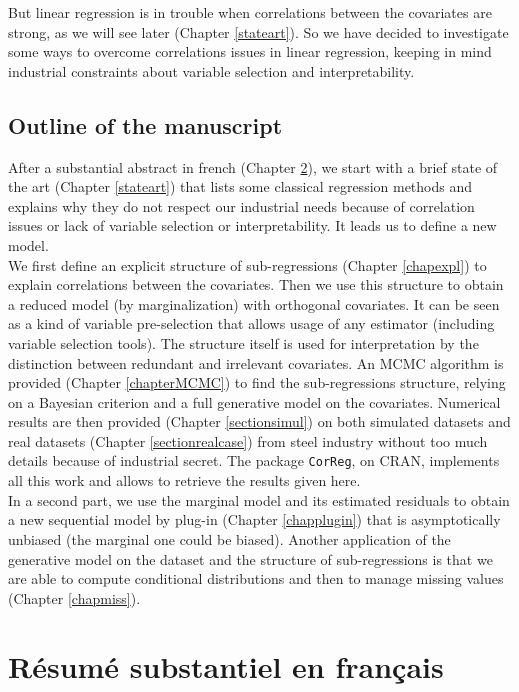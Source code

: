 \documentclass[12pt,a4paper]{report}
\begin{document}
	But linear regression is in trouble when correlations between the covariates are strong, as we will see later (Chapter \ref{stateart}). So we have decided to investigate some ways to overcome correlations issues in linear regression, keeping in mind industrial constraints about variable selection and interpretability.
	
	\section{Outline of the manuscript}%
		After a substantial abstract in french (Chapter \ref{frenchsum}), we start with a brief state of the art (Chapter \ref{stateart}) that lists some classical regression methods and explains why they do not respect our industrial needs because of correlation issues or lack of variable selection or interpretability. It leads us to define a new model.\\
		
		We first define an explicit structure of sub-regressions (Chapter \ref{chapexpl}) to explain correlations between the covariates. Then we use this structure to obtain a reduced model (by marginalization) with orthogonal covariates. It can be seen as a kind of variable pre-selection that allows usage of any estimator (including variable selection tools). The structure itself is used for interpretation by the distinction between redundant and irrelevant covariates. An MCMC algorithm is provided (Chapter \ref{chapterMCMC}) to find the sub-regressions structure, relying on a Bayesian criterion and a full generative model on the covariates. Numerical results are then provided (Chapter \ref{sectionsimul}) on both simulated datasets and real datasets (Chapter \ref{sectionrealcase}) from steel industry without too much details because of industrial secret. The package {\tt CorReg}, on CRAN, implements all this work and allows to retrieve the results given here. \\
		
		In a second part, we use the marginal model and its estimated residuals to obtain a new sequential model by plug-in (Chapter \ref{chapplugin}) that is asymptotically unbiased (the marginal one could be biased). Another application of the generative model on the dataset and the structure of sub-regressions is that we are able to compute conditional distributions and then to manage missing values (Chapter \ref{chapmiss}).  
		
\chapter{Résumé substantiel en français}\label{frenchsum}
\end{document}
